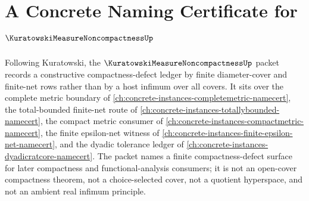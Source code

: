 \chapter{A Concrete Naming Certificate for $\KuratowskiMeasureNoncompactnessUp$}
\label{ch:concrete-instances-kuratowski-measure-noncompactness-namecert}

Following Kuratowski, the $\KuratowskiMeasureNoncompactnessUp$ packet records a constructive compactness-defect ledger by finite diameter-cover and finite-net rows rather than by a host infimum over all covers. It sits over the complete metric boundary of \autoref{ch:concrete-instances-completemetric-namecert}, the total-bounded finite-net route of \autoref{ch:concrete-instances-totallybounded-namecert}, the compact metric consumer of \autoref{ch:concrete-instances-compactmetric-namecert}, the finite epsilon-net witness of \autoref{ch:concrete-instances-finite-epsilon-net-namecert}, and the dyadic tolerance ledger of \autoref{ch:concrete-instances-dyadicratcore-namecert}. The packet names a finite compactness-defect surface for later compactness and functional-analysis consumers; it is not an open-cover compactness theorem, not a choice-selected cover, not a quotient hyperspace, and not an ambient real infimum principle.

